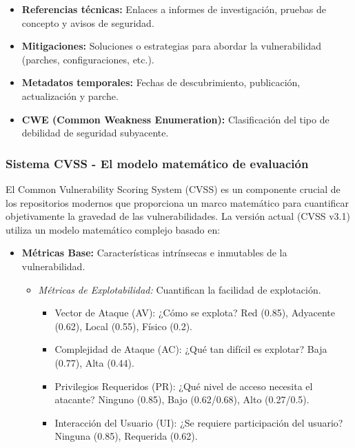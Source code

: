 {\begin{itemize}
    \item \textbf{Referencias técnicas:} Enlaces a informes de investigación, pruebas de concepto y avisos de seguridad.
    
    \item \textbf{Mitigaciones:} Soluciones o estrategias para abordar la vulnerabilidad (parches, configuraciones, etc.).
    
    \item \textbf{Metadatos temporales:} Fechas de descubrimiento, publicación, actualización y parche.
    
    \item \textbf{CWE (Common Weakness Enumeration):} Clasificación del tipo de debilidad de seguridad subyacente.
\end{itemize}

\subsubsection{Sistema CVSS - El modelo matemático de evaluación}

El Common Vulnerability Scoring System (CVSS) es un componente crucial de los repositorios modernos que proporciona un marco matemático para cuantificar objetivamente la gravedad de las vulnerabilidades. La versión actual (CVSS v3.1) utiliza un modelo matemático complejo basado en:

\begin{itemize}
    \item \textbf{Métricas Base:} Características intrínsecas e inmutables de la vulnerabilidad.
    \begin{itemize}
        \item \textit{Métricas de Explotabilidad:} Cuantifican la facilidad de explotación.
        \begin{itemize}
            \item Vector de Ataque (AV): ¿Cómo se explota? Red (0.85), Adyacente (0.62), Local (0.55), Físico (0.2).
            \item Complejidad de Ataque (AC): ¿Qué tan difícil es explotar? Baja (0.77), Alta (0.44).
            \item Privilegios Requeridos (PR): ¿Qué nivel de acceso necesita el atacante? Ninguno (0.85), Bajo (0.62/0.68), Alto (0.27/0.5).
            \item Interacción del Usuario (UI): ¿Se requiere participación del usuario? Ninguna (0.85), Requerida (0.62).
        \end{itemize}
        

\end{itemize}
\end{itemize}}
